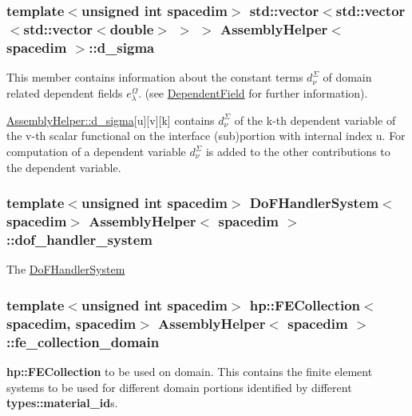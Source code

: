 \subsubsection[{\texorpdfstring{d\+\_\+sigma}{d_sigma}}]{\setlength{\rightskip}{0pt plus 5cm}template$<$unsigned int spacedim$>$ std\+::vector$<$std\+::vector$<$std\+::vector$<$double$>$ $>$ $>$ {\bf Assembly\+Helper}$<$ spacedim $>$\+::d\+\_\+sigma\hspace{0.3cm}{\ttfamily [private]}}\hypertarget{class_assembly_helper_a48d7d677120eb1c84b4983f470246e02}{}\label{class_assembly_helper_a48d7d677120eb1c84b4983f470246e02}
This member contains information about the constant terms $d^\Sigma_\nu$ of domain related dependent fields $e^\Omega_\lambda$. (see \hyperlink{class_dependent_field}{Dependent\+Field} for further information).

\hyperlink{class_assembly_helper_a48d7d677120eb1c84b4983f470246e02}{Assembly\+Helper\+::d\+\_\+sigma}\mbox{[}{\ttfamily u}\mbox{]}\mbox{[}{\ttfamily v}\mbox{]}\mbox{[}{\ttfamily k}\mbox{]} contains $d^\Sigma_\nu$ of the {\ttfamily k-\/th} dependent variable of the {\ttfamily v-\/th} scalar functional on the interface (sub)portion with internal index {\ttfamily u}. For computation of a dependent variable $d^\Sigma_{\nu}$ is added to the other contributions to the dependent variable. 
\subsubsection[{\texorpdfstring{dof\+\_\+handler\+\_\+system}{dof_handler_system}}]{\setlength{\rightskip}{0pt plus 5cm}template$<$unsigned int spacedim$>$ {\bf Do\+F\+Handler\+System}$<$spacedim$>$ {\bf Assembly\+Helper}$<$ spacedim $>$\+::dof\+\_\+handler\+\_\+system\hspace{0.3cm}{\ttfamily [private]}}\hypertarget{class_assembly_helper_a885e660c749e91a35e3279643ebcd87f}{}\label{class_assembly_helper_a885e660c749e91a35e3279643ebcd87f}
The \hyperlink{class_do_f_handler_system}{Do\+F\+Handler\+System} 
\subsubsection[{\texorpdfstring{fe\+\_\+collection\+\_\+domain}{fe_collection_domain}}]{\setlength{\rightskip}{0pt plus 5cm}template$<$unsigned int spacedim$>$ {\bf hp\+::\+F\+E\+Collection}$<$spacedim, spacedim$>$ {\bf Assembly\+Helper}$<$ spacedim $>$\+::fe\+\_\+collection\+\_\+domain\hspace{0.3cm}{\ttfamily [private]}}\hypertarget{class_assembly_helper_af3803b0aad9853e6bf018c70be41e791}{}\label{class_assembly_helper_af3803b0aad9853e6bf018c70be41e791}
{\bf hp\+::\+F\+E\+Collection} to be used on domain. This contains the finite element systems to be used for different domain portions identified by different {\bf types\+::material\+\_\+id}s.

